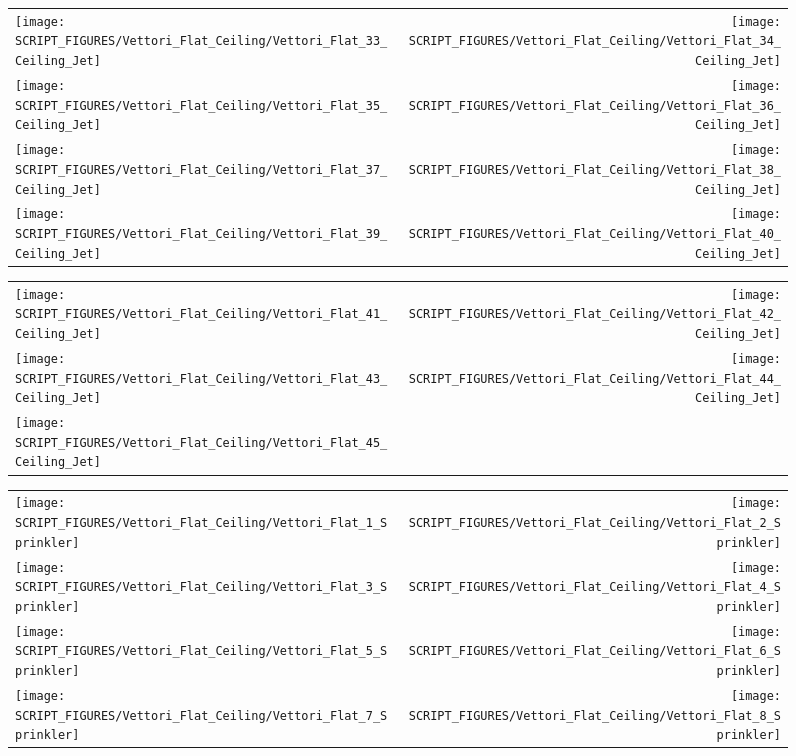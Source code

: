 \begin{figure}[!ht]
\begin{tabular*}{\textwidth}{l@{\extracolsep{\fill}}r}
\texttt{[image: SCRIPT\_FIGURES/Vettori\_Flat\_Ceiling/Vettori\_Flat\_33\_Ceiling\_Jet]} &
\texttt{[image: SCRIPT\_FIGURES/Vettori\_Flat\_Ceiling/Vettori\_Flat\_34\_Ceiling\_Jet]} \\
\texttt{[image: SCRIPT\_FIGURES/Vettori\_Flat\_Ceiling/Vettori\_Flat\_35\_Ceiling\_Jet]} &
\texttt{[image: SCRIPT\_FIGURES/Vettori\_Flat\_Ceiling/Vettori\_Flat\_36\_Ceiling\_Jet]} \\
\texttt{[image: SCRIPT\_FIGURES/Vettori\_Flat\_Ceiling/Vettori\_Flat\_37\_Ceiling\_Jet]} &
\texttt{[image: SCRIPT\_FIGURES/Vettori\_Flat\_Ceiling/Vettori\_Flat\_38\_Ceiling\_Jet]} \\
\texttt{[image: SCRIPT\_FIGURES/Vettori\_Flat\_Ceiling/Vettori\_Flat\_39\_Ceiling\_Jet]} &
\texttt{[image: SCRIPT\_FIGURES/Vettori\_Flat\_Ceiling/Vettori\_Flat\_40\_Ceiling\_Jet]}
\end{tabular*}
\end{figure}

\begin{figure}[!ht]
\begin{tabular*}{\textwidth}{l@{\extracolsep{\fill}}r}
\texttt{[image: SCRIPT\_FIGURES/Vettori\_Flat\_Ceiling/Vettori\_Flat\_41\_Ceiling\_Jet]} &
\texttt{[image: SCRIPT\_FIGURES/Vettori\_Flat\_Ceiling/Vettori\_Flat\_42\_Ceiling\_Jet]} \\
\texttt{[image: SCRIPT\_FIGURES/Vettori\_Flat\_Ceiling/Vettori\_Flat\_43\_Ceiling\_Jet]} &
\texttt{[image: SCRIPT\_FIGURES/Vettori\_Flat\_Ceiling/Vettori\_Flat\_44\_Ceiling\_Jet]} \\
\texttt{[image: SCRIPT\_FIGURES/Vettori\_Flat\_Ceiling/Vettori\_Flat\_45\_Ceiling\_Jet]}
\end{tabular*}
\end{figure}

\begin{figure}[!ht]
\begin{tabular*}{\textwidth}{l@{\extracolsep{\fill}}r}
\texttt{[image: SCRIPT\_FIGURES/Vettori\_Flat\_Ceiling/Vettori\_Flat\_1\_Sprinkler]} &
\texttt{[image: SCRIPT\_FIGURES/Vettori\_Flat\_Ceiling/Vettori\_Flat\_2\_Sprinkler]} \\
\texttt{[image: SCRIPT\_FIGURES/Vettori\_Flat\_Ceiling/Vettori\_Flat\_3\_Sprinkler]} &
\texttt{[image: SCRIPT\_FIGURES/Vettori\_Flat\_Ceiling/Vettori\_Flat\_4\_Sprinkler]} \\
\texttt{[image: SCRIPT\_FIGURES/Vettori\_Flat\_Ceiling/Vettori\_Flat\_5\_Sprinkler]} &
\texttt{[image: SCRIPT\_FIGURES/Vettori\_Flat\_Ceiling/Vettori\_Flat\_6\_Sprinkler]} \\
\texttt{[image: SCRIPT\_FIGURES/Vettori\_Flat\_Ceiling/Vettori\_Flat\_7\_Sprinkler]} &
\texttt{[image: SCRIPT\_FIGURES/Vettori\_Flat\_Ceiling/Vettori\_Flat\_8\_Sprinkler]}
\end{tabular*}
\end{figure}

